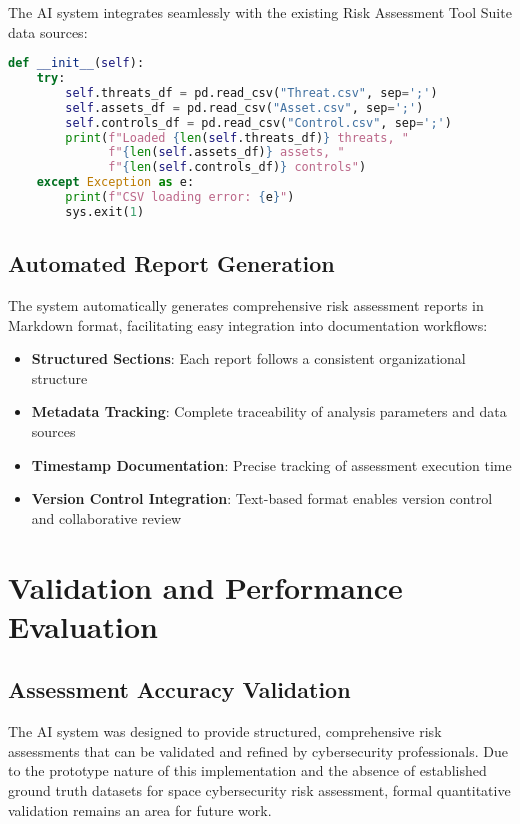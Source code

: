 \documentclass[binding=0.6cm]{sapthesis}
\begin{document}
The AI system integrates seamlessly with the existing Risk Assessment Tool Suite data sources:

\begin{lstlisting}[language=Python, caption=Data Integration Implementation]
def __init__(self):
    try:
        self.threats_df = pd.read_csv("Threat.csv", sep=';')
        self.assets_df = pd.read_csv("Asset.csv", sep=';') 
        self.controls_df = pd.read_csv("Control.csv", sep=';')
        print(f"Loaded {len(self.threats_df)} threats, "
              f"{len(self.assets_df)} assets, "
              f"{len(self.controls_df)} controls")
    except Exception as e:
        print(f"CSV loading error: {e}")
        sys.exit(1)
\end{lstlisting}

\subsection{Automated Report Generation}

The system automatically generates comprehensive risk assessment reports in Markdown format, facilitating easy integration into documentation workflows:

\begin{itemize}
    \item \textbf{Structured Sections}: Each report follows a consistent organizational structure
    \item \textbf{Metadata Tracking}: Complete traceability of analysis parameters and data sources
    \item \textbf{Timestamp Documentation}: Precise tracking of assessment execution time
    \item \textbf{Version Control Integration}: Text-based format enables version control and collaborative review
\end{itemize}

\section{Validation and Performance Evaluation}

\subsection{Assessment Accuracy Validation}

The AI system was designed to provide structured, comprehensive risk assessments that can be validated and refined by cybersecurity professionals. Due to the prototype nature of this implementation and the absence of established ground truth datasets for space cybersecurity risk assessment, formal quantitative validation remains an area for future work.
\end{document}
